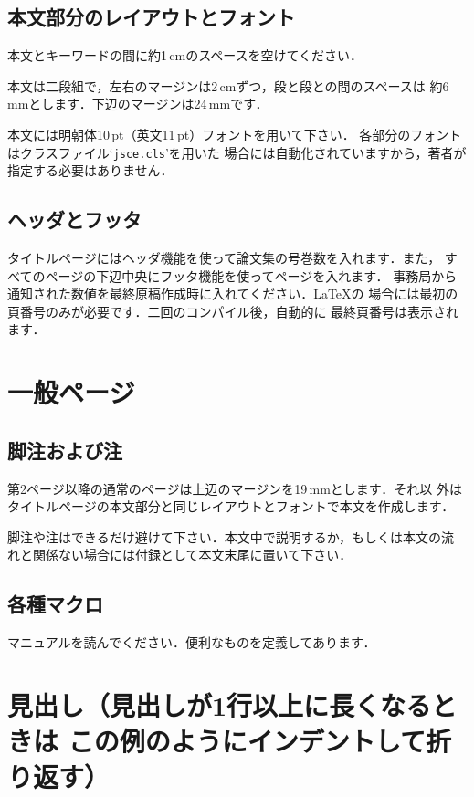 \documentclass[dvipdfmx]{jsce}
\begin{document}
\subsection{本文部分のレイアウトとフォント}

本文とキーワードの間に約1\,cmのスペースを空けてください．

本文は二段組で，左右のマージンは2\,cmずつ，段と段との間のスペースは
約6\,mmとします．下辺のマージンは24\,mmです．

本文には明朝体10\,pt（英文11\,pt）フォントを用いて下さい．
各部分のフォントはクラスファイル`{\tt jsce.cls}'を用いた
場合には自動化されていますから，著者が指定する必要はありません．

\subsection{ヘッダとフッタ}

タイトルページにはヘッダ機能を使って論文集の号巻数を入れます．また，
すべてのページの下辺中央にフッタ機能を使ってページを入れます．
事務局から通知された数値を最終原稿作成時に入れてください．\LaTeX の
場合には最初の頁番号のみが必要です．二回のコンパイル後，自動的に
最終頁番号は表示されます．

\section{一般ページ}

\subsection{脚注および注}

第2ページ以降の通常のページは上辺のマージンを19\,mmとします．それ以
外はタイトルページの本文部分と同じレイアウトとフォントで本文を作成します．

脚注や注はできるだけ避けて下さい．本文中で説明するか，もしくは本文の流
れと関係ない場合には付録として本文末尾に置いて下さい．

\subsection{各種マクロ}

マニュアルを読んでください．便利なものを定義してあります．

\section{見出し（見出しが1行以上に長くなるときは
この例のようにインデントして折り返す）}
\end{document}
